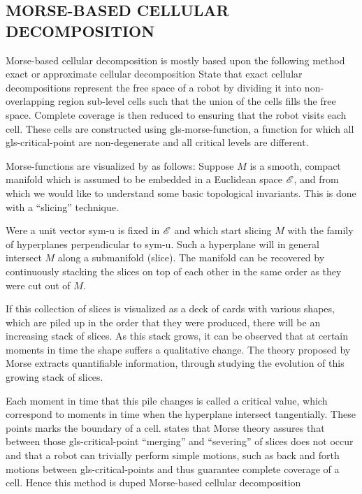 \subsection{MORSE-BASED CELLULAR DECOMPOSITION}
Morse-based cellular decomposition is mostly based upon the following method exact or approximate cellular
decomposition \citet{acar_morse_2002} State that exact cellular decompositions represent the free space
of a robot by dividing it into non-overlapping region sub-level cells such that the union of the cells fills the free
space. Complete coverage is then reduced to ensuring that the robot visits each cell. These cells are constructed using
\gls{gls-morse-function}, a function for which all \gls{gls-critical-point} are non-degenerate and all critical levels
are different.

Morse-functions are visualized by \citet{nicolaescu_invitation_2007} as follows: Suppose \( M \) is a smooth, compact
manifold which is assumed to be embedded in a Euclidean space \( \operatorname{\mathscr{E}} \), and from which we would like to understand
some basic topological invariants. This is done with a ``slicing'' technique.

Were a unit vector \gls{sym-u} is fixed in \( \operatorname{\mathscr{E}} \) and which start slicing \( M \) with the family of hyperplanes
perpendicular to  \gls{sym-u}. Such a hyperplane will in general intersect \( M \) along a submanifold (slice). The
manifold can be recovered by continuously stacking the slices on top of each other in the same order as they were cut
out of \( M \).

If this collection of slices is visualized as a deck of cards with various shapes, which are piled up in the order that
they were produced, there will be an increasing stack of slices. As this stack grows, it can be observed that at certain
moments in time the shape suffers a qualitative change. The theory proposed by Morse extracts quantifiable information,
through studying the evolution of this growing stack of slices.

Each moment in time that this pile changes is called a critical value, which correspond to moments in time when the
hyperplane intersect tangentially. These points marks the boundary of a cell. \citet{acar_morse_2002} states that Morse
theory assures that between those \gls{gls-critical-point} ``merging'' and ``severing'' of slices does not occur and
that a robot can trivially perform simple motions, such as back and forth motions between \gls{gls-critical-point}s and
thus guarantee complete coverage of a cell. Hence this method is duped Morse-based cellular decomposition

